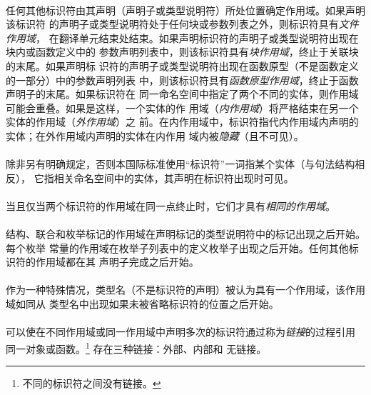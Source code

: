 \paragraph{}
任何其他标识符由其声明（声明子或类型说明符）所处位置确定作用域。如果声明该标识符
的声明子或类型说明符处于任何块或参数列表之外，则标识符具有\textit{文件作用域}，
在翻译单元结束处结束。如果声明标识符的声明子或类型说明符出现在块内或函数定义中的
参数声明列表中，则该标识符具有\textit{块作用域}，终止于关联块的末尾。如果声明标
识符的声明子或类型说明符出现在函数原型（不是函数定义的一部分）中的参数声明列表
中，则该标识符具有\textit{函数原型作用域}，终止于函数声明子的末尾。如果标识符在
同一命名空间中指定了两个不同的实体，则作用域可能会重叠。如果是这样，一个实体的作
用域（\textit{内作用域}）将严格结束在另一个实体的作用域（\textit{外作用域}）之
前。在内作用域中，标识符指代内作用域内声明的实体；在外作用域内声明的实体在内作用
域内被\textit{隐藏}（且不可见）。

\paragraph{}
除非另有明确规定，否则本国际标准使用``标识符''一词指某个实体（与句法结构相反），
它指相关命名空间中的实体，其声明在标识符出现时可见。

\paragraph{}
当且仅当两个标识符的作用域在同一点终止时，它们才具有\textit{相同的作用域}。

\paragraph{}
结构、联合和枚举标记的作用域在声明标记的类型说明符中的标记出现之后开始。每个枚举
常量的作用域在枚举子列表中的定义枚举子出现之后开始。任何其他标识符的作用域都在其
声明子完成之后开始。

\paragraph{}
作为一种特殊情况，类型名（不是标识符的声明）被认为具有一个作用域，该作用域如同从
类型名中出现如果未被省略标识符的位置之后开始。


\paragraph{}
可以使在不同作用域或同一作用域中声明多次的标识符通过称为\textit{链接}的过程引用
同一对象或函数。\footnote{不同的标识符之间没有链接。} 存在三种链接：外部、内部和
无链接。

